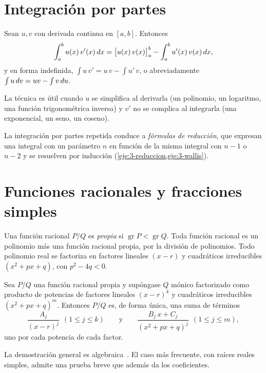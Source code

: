 \addtocounter{definicion}{1}%

\section{Integración por partes}

\begin{teorema}\label{teo:partes}
Sean $u,v$ con derivada continua en $[a,b]$. Entonces
\[
\int_a^b u(x)\,v'(x)\mathop{}\!d x=\bigl[u(x)\,v(x)\bigr]_{a}^{b}-\int_a^b u'(x)\,v(x)\mathop{}\!d x ,
\]
y en forma indefinida, $\int u\,v'=u\,v-\int u'\,v$, o abreviadamente $\int u\mathop{}\!d v=uv-\int v\mathop{}\!d u$.
\end{teorema}

La técnica es útil cuando $u$ se simplifica al derivarla (un polinomio, un logaritmo, una función trigonométrica inversa) y $v'$ no se complica al integrarla (una exponencial, un seno, un coseno).

\addtocounter{definicion}{1}%

La integración por partes repetida conduce a \emph{fórmulas de reducción}, que expresan una integral con un parámetro $n$ en función de la misma integral con $n-1$ o $n-2$ y se resuelven por inducción (\cref{eje:3-reduccion,eje:3-wallis}).

\section{Funciones racionales y fracciones simples}

Una función racional $P/Q$ es \emph{propia} si $\operatorname{gr}P<\operatorname{gr}Q$. Toda función racional es un polinomio más una función racional propia, por la división de polinomios. Todo polinomio real se factoriza en factores lineales $(x-r)$ y cuadráticos irreducibles $(x^{2}+px+q)$, con $p^{2}-4q<0$.

\begin{teorema}\label{teo:fracciones}
Sea $P/Q$ una función racional propia y supóngase $Q$ mónico factorizado como producto de potencias de factores lineales $(x-r)^{k}$ y cuadráticos irreducibles $(x^{2}+px+q)^{m}$. Entonces $P/Q$ es, de forma única, una suma de términos
\[
\frac{A_j}{(x-r)^{j}}\ \ (1\le j\le k)\qquad\text{y}\qquad\frac{B_j\,x+C_j}{(x^{2}+px+q)^{j}}\ \ (1\le j\le m),
\]
uno por cada potencia de cada factor.
\end{teorema}

La demostración general es algebraica~\cite[cap.~19]{spivak}. El caso más frecuente, con raíces reales simples, admite una prueba breve que además da los coeficientes.

